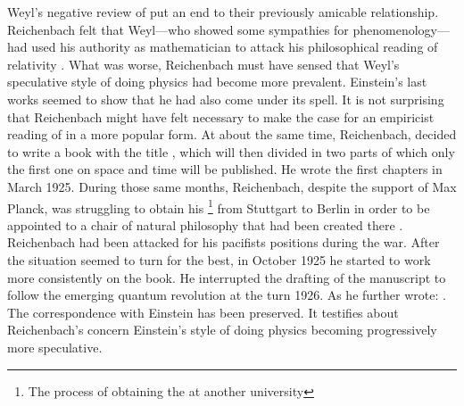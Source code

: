 \documentclass[draft]{article}
\begin{document}
Weyl's negative review of \citep{Weyl1924} put an end to their previously amicable relationship. Reichenbach felt that Weyl---who showed some sympathies for phenomenology---had used his authority as mathematician to attack his philosophical reading of relativity \citep{Reichenbach1925}. What was worse, Reichenbach must have sensed that Weyl's speculative style of doing physics had become more prevalent. Einstein's last works seemed to show that he had also come under its spell. It is not surprising that Reichenbach might have felt necessary to make the case for an empiricist reading of \rt in a more popular form. At about the same time, Reichenbach, decided to write a book with the title , which will then divided in two parts of which only the first one on space and time will be published. He wrote the first chapters in March 1925. During those same months, Reichenbach, despite the support of Max Planck, was struggling to obtain his \footnote{The process of obtaining the  at another university} from Stuttgart to Berlin in order to be appointed to a chair of natural philosophy that had been created there \citep{Hecht1982}. Reichenbach had been attacked for his pacifists positions during the war. After the situation seemed to turn for the best, in October 1925 he started to work more consistently on the book. He interrupted the drafting of the manuscript to follow the emerging quantum revolution at the turn 1926. As he further wrote: . The correspondence with Einstein has been preserved. It testifies about Reichenbach's concern Einstein's style of doing physics becoming progressively more speculative. 

\end{document}
